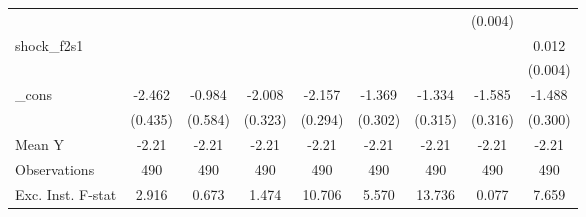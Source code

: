 {\begin{tabular}{l*{8}{c}}
            &                     &                     &                     &                     &                     &                     &     (0.004)         &                     \\
\addlinespace
shock\_f2s1  &                     &                     &                     &                     &                     &                     &                     &       0.012\sym{**} \\
            &                     &                     &                     &                     &                     &                     &                     &     (0.004)         \\
\addlinespace
\_cons      &      -2.462\sym{***}&      -0.984         &      -2.008\sym{***}&      -2.157\sym{***}&      -1.369\sym{***}&      -1.334\sym{***}&      -1.585\sym{***}&      -1.488\sym{***}\\
            &     (0.435)         &     (0.584)         &     (0.323)         &     (0.294)         &     (0.302)         &     (0.315)         &     (0.316)         &     (0.300)         \\
\midrule
Mean Y      &       -2.21         &       -2.21         &       -2.21         &       -2.21         &       -2.21         &       -2.21         &       -2.21         &       -2.21         \\
Observations&         490         &         490         &         490         &         490         &         490         &         490         &         490         &         490         \\
Exc. Inst. F-stat&       2.916         &       0.673         &       1.474         &      10.706         &       5.570         &      13.736         &       0.077         &       7.659         \\
\bottomrule
\end{tabular}
}
